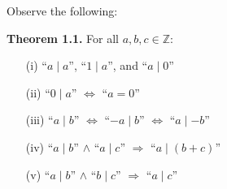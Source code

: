 \newpage

\noindent
Observe the following:
\begin{theo}

    \textbf{Theorem 1.1.} For all $a, b, c \in \mathbb{Z}$:

    \begin{itemize}
        \item[(i)] ``$a \mid a$'', ``$1 \mid a$'', and ``$a \mid 0$''
        \item[(ii)] ``$0 \mid a$'' $\Longleftrightarrow$ ``$a = 0$''
        \item[(iii)] ``$a \mid b$'' $\Longleftrightarrow$ ``$-a \mid b$'' $\Longleftrightarrow$ ``$a \mid -b$''
        \item[(iv)] ``$a \mid b$'' $\land$ ``$a \mid c$'' $\Longrightarrow$ ``$a \mid (b + c)$''
        \item[(v)] ``$a \mid b$'' $\land$ ``$b \mid c$'' $\Longrightarrow$ ``$a \mid c$''
    \end{itemize}
\end{theo}

